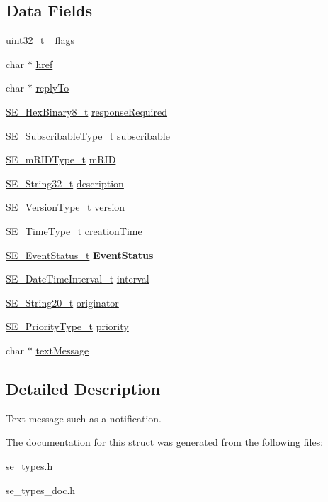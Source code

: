 \subsection*{Data Fields}
\begin{DoxyCompactItemize}
\item 
uint32\+\_\+t \hyperlink{group__TextMessage_gaf629d5b9d66e6a1e00c8ffe32295eeef}{\+\_\+flags}
\item 
char $\ast$ \hyperlink{group__TextMessage_gabc820eedb6d1736d60a5f79c82dfbcd4}{href}
\item 
char $\ast$ \hyperlink{group__TextMessage_gaef01814e071285a1c298efe3d7f04ad8}{reply\+To}
\item 
\hyperlink{group__HexBinary8_gaecf2dab3615fb954a693c017a61f77d6}{S\+E\+\_\+\+Hex\+Binary8\+\_\+t} \hyperlink{group__TextMessage_gaef788047a5043fd8cdba5706dd69c868}{response\+Required}
\item 
\hyperlink{group__SubscribableType_ga5c41f553d369710ed34619266bf2551e}{S\+E\+\_\+\+Subscribable\+Type\+\_\+t} \hyperlink{group__TextMessage_gaac87d3ebb2b9b25e58bec8fe5d86b102}{subscribable}
\item 
\hyperlink{group__mRIDType_gac74622112f3a388a2851b2289963ba5e}{S\+E\+\_\+m\+R\+I\+D\+Type\+\_\+t} \hyperlink{group__TextMessage_ga48f143c96b8696ced14ce0ab1445f4dc}{m\+R\+ID}
\item 
\hyperlink{group__String32_gac9f59b06b168b4d2e0d45ed41699af42}{S\+E\+\_\+\+String32\+\_\+t} \hyperlink{group__TextMessage_gada927270875bfc2e7cb7fbd675168e86}{description}
\item 
\hyperlink{group__VersionType_ga4b8d27838226948397ed99f67d46e2ae}{S\+E\+\_\+\+Version\+Type\+\_\+t} \hyperlink{group__TextMessage_ga9101eb2e0eeca3eac5a47da06fb26423}{version}
\item 
\hyperlink{group__TimeType_ga6fba87a5b57829b4ff3f0e7638156682}{S\+E\+\_\+\+Time\+Type\+\_\+t} \hyperlink{group__TextMessage_ga26ae5914787c481dbbf7052be2087a2c}{creation\+Time}
\item 
\hyperlink{structSE__EventStatus__t}{S\+E\+\_\+\+Event\+Status\+\_\+t} {\bfseries Event\+Status}
\item 
\hyperlink{structSE__DateTimeInterval__t}{S\+E\+\_\+\+Date\+Time\+Interval\+\_\+t} \hyperlink{group__TextMessage_ga34dbbe164fb39086ab9ea1dc2cb993df}{interval}
\item 
\hyperlink{group__String20_gac62354528eb48096f8deab6e503a3193}{S\+E\+\_\+\+String20\+\_\+t} \hyperlink{group__TextMessage_ga926d4d6f8b8b3e8f5c39c0b391c17261}{originator}
\item 
\hyperlink{group__PriorityType_ga809c127a21bbe2efe64f393fa04be0c3}{S\+E\+\_\+\+Priority\+Type\+\_\+t} \hyperlink{group__TextMessage_gabaf18bd2a16c44de5f1c0be141c8d841}{priority}
\item 
char $\ast$ \hyperlink{group__TextMessage_ga681f5ae7a8773a4381420445c9ae75ec}{text\+Message}
\end{DoxyCompactItemize}


\subsection{Detailed Description}
Text message such as a notification. 

The documentation for this struct was generated from the following files\+:\begin{DoxyCompactItemize}
\item 
se\+\_\+types.\+h\item 
se\+\_\+types\+\_\+doc.\+h\end{DoxyCompactItemize}
